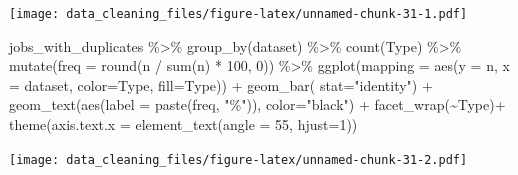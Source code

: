 \documentclass[
]{article}
\newenvironment{Shaded}{\begin{snugshade}}{\end{snugshade}}
\newcommand{\DataTypeTok}[1]{\textcolor[rgb]{0.87,0.87,0.75}{#1}}
\newcommand{\DecValTok}[1]{\textcolor[rgb]{0.86,0.86,0.80}{#1}}
\newcommand{\KeywordTok}[1]{\textcolor[rgb]{0.94,0.87,0.69}{#1}}
\newcommand{\NormalTok}[1]{\textcolor[rgb]{0.80,0.80,0.80}{#1}}
\newcommand{\OperatorTok}[1]{\textcolor[rgb]{0.94,0.94,0.82}{#1}}
\newcommand{\StringTok}[1]{\textcolor[rgb]{0.80,0.58,0.58}{#1}}
\begin{document}
\texttt{[image: data\_cleaning\_files/figure-latex/unnamed-chunk-31-1.pdf]}

\begin{Shaded}
\begin{Highlighting}[]
\NormalTok{jobs\_with\_duplicates }\OperatorTok{\%\textgreater{}\%}\StringTok{ }
\StringTok{  }\KeywordTok{group\_by}\NormalTok{(dataset) }\OperatorTok{\%\textgreater{}\%}\StringTok{ }
\StringTok{  }\KeywordTok{count}\NormalTok{(Type) }\OperatorTok{\%\textgreater{}\%}
\StringTok{  }\KeywordTok{mutate}\NormalTok{(}\DataTypeTok{freq =} \KeywordTok{round}\NormalTok{(n }\OperatorTok{/}\StringTok{ }\KeywordTok{sum}\NormalTok{(n) }\OperatorTok{*}\StringTok{ }\DecValTok{100}\NormalTok{, }\DecValTok{0}\NormalTok{)) }\OperatorTok{\%\textgreater{}\%}\StringTok{ }
\StringTok{  }\KeywordTok{ggplot}\NormalTok{(}\DataTypeTok{mapping =} \KeywordTok{aes}\NormalTok{(}\DataTypeTok{y =}\NormalTok{ n, }\DataTypeTok{x =}\NormalTok{ dataset, }\DataTypeTok{color=}\NormalTok{Type, }\DataTypeTok{fill=}\NormalTok{Type)) }\OperatorTok{+}\StringTok{ }\KeywordTok{geom\_bar}\NormalTok{( }\DataTypeTok{stat=}\StringTok{"identity"}\NormalTok{) }\OperatorTok{+}\StringTok{ }\KeywordTok{geom\_text}\NormalTok{(}\KeywordTok{aes}\NormalTok{(}\DataTypeTok{label =} \KeywordTok{paste}\NormalTok{(freq, }\StringTok{"\%"}\NormalTok{)), }\DataTypeTok{color=}\StringTok{"black"}\NormalTok{) }\OperatorTok{+}\StringTok{ }\KeywordTok{facet\_wrap}\NormalTok{(}\OperatorTok{\textasciitilde{}}\NormalTok{Type)}\OperatorTok{+}\StringTok{ }\KeywordTok{theme}\NormalTok{(}\DataTypeTok{axis.text.x =} \KeywordTok{element\_text}\NormalTok{(}\DataTypeTok{angle =} \DecValTok{55}\NormalTok{, }\DataTypeTok{hjust=}\DecValTok{1}\NormalTok{))}
\end{Highlighting}
\end{Shaded}

\texttt{[image: data\_cleaning\_files/figure-latex/unnamed-chunk-31-2.pdf]}
\end{document}

